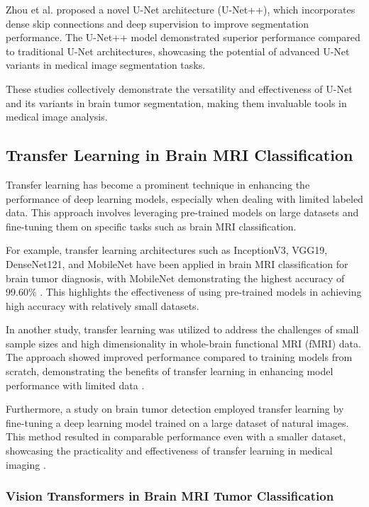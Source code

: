 Zhou et al. \cite{zhou2018unetplusplus} proposed a novel U-Net architecture (U-Net++), which incorporates dense skip connections and deep supervision to improve segmentation performance. The U-Net++ model demonstrated superior performance compared to traditional U-Net architectures, showcasing the potential of advanced U-Net variants in medical image segmentation tasks.

These studies collectively demonstrate the versatility and effectiveness of U-Net and its variants in brain tumor segmentation, making them invaluable tools in medical image analysis.

\subsection{Transfer Learning in Brain MRI Classification}

Transfer learning has become a prominent technique in enhancing the performance of deep learning models, especially when dealing with limited labeled data. This approach involves leveraging pre-trained models on large datasets and fine-tuning them on specific tasks such as brain MRI classification.

For example, transfer learning architectures such as InceptionV3, VGG19, DenseNet121, and MobileNet have been applied in brain MRI classification for brain tumor diagnosis, with MobileNet demonstrating the highest accuracy of 99.60\% \cite{Islam_Barua_Rahman_Ahammed_Akter_Uddin_2023}. This highlights the effectiveness of using pre-trained models in achieving high accuracy with relatively small datasets.

In another study, transfer learning was utilized to address the challenges of small sample sizes and high dimensionality in whole-brain functional MRI (fMRI) data. The approach showed improved performance compared to training models from scratch, demonstrating the benefits of transfer learning in enhancing model performance with limited data \cite{10.1007/978-3-030-32695-1_7}.

Furthermore, a study on brain tumor detection employed transfer learning by fine-tuning a deep learning model trained on a large dataset of natural images. This method resulted in comparable performance even with a smaller dataset, showcasing the practicality and effectiveness of transfer learning in medical imaging \cite{10125766}.


\subsubsection{Vision Transformers in Brain MRI Tumor Classification}


